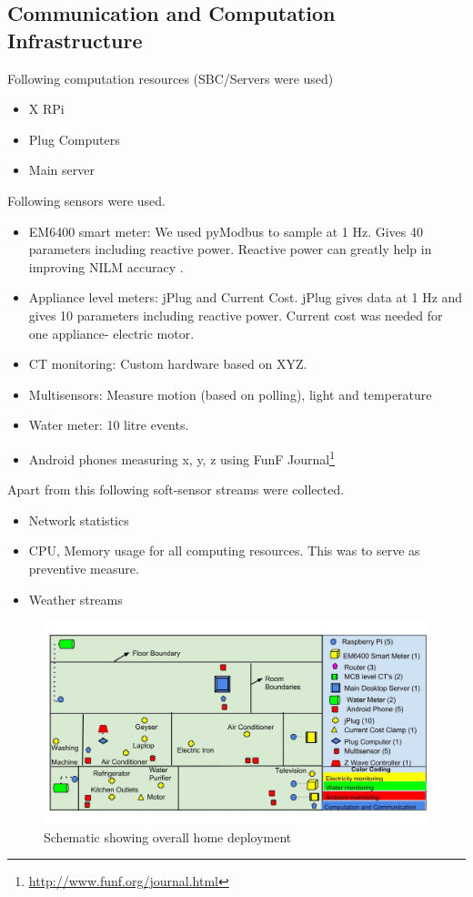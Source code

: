 \documentclass[10pt]{sensys-proc}
\begin{document}
\subsection{Communication and Computation Infrastructure}
Following computation resources (SBC/Servers were used)
\begin{itemize}
\item X RPi
\item Plug Computers
\item Main server
\end{itemize}
Following sensors were used.
\begin{itemize}
\item EM6400 smart meter: We used pyModbus to sample at 1 Hz. Gives 40 parameters including reactive power. Reactive power can greatly help in improving NILM accuracy \cite{hart}. 
\item Appliance level meters: jPlug and Current Cost. jPlug gives data at 1 Hz and gives 10 parameters including reactive power. Current cost was needed for one appliance- electric motor.
\item CT monitoring: Custom hardware based on  XYZ.
\item Multisensors: Measure motion (based on polling), light and temperature
\item Water meter: 10 litre events. 
\item Android phones measuring x, y, z using FunF Journal\footnote{\url{http://www.funf.org/journal.html}}
\end{itemize}
Apart from this following soft-sensor streams were collected.
\begin{itemize}
\item Network statistics
\item CPU, Memory usage for all computing resources. This was to serve as preventive measure.
\item Weather streams
\end{itemize}
\begin{figure}     
    \includegraphics[scale=0.2]{./figures/overall_deployment.jpg}    
    \caption{Schematic showing overall home deployment}   
    \label{fig:overall}
   
\end{figure}
\end{document}
